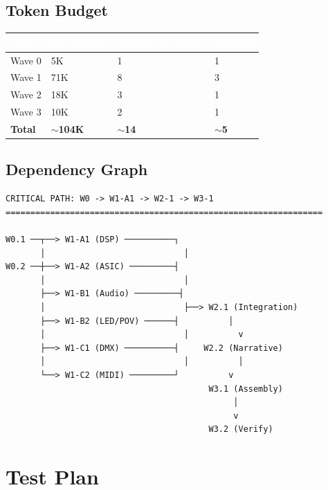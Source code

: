 \documentclass[11pt,letterpaper]{article}
\newcommand{\tableheader}[1]{\textbf{\sffamily\textcolor{white}{#1}}}
\begin{document}
\subsection{Token Budget}

\begin{center}
\begin{tabularx}{\textwidth}{L{3cm}C{2.5cm}C{3cm}C{2.5cm}}
\toprule
{}
\tableheader{Wave} & \tableheader{Est. Tokens} & \tableheader{Context Windows} & \tableheader{Sessions} \\
\midrule
Wave 0 & 5K & 1 & 1 \\
Wave 1 & 71K & 8 & 3 \\
Wave 2 & 18K & 3 & 1 \\
Wave 3 & 10K & 2 & 1 \\
\midrule
\textbf{Total} & \textbf{$\sim$104K} & \textbf{$\sim$14} & \textbf{$\sim$5} \\
\bottomrule
\end{tabularx}
\end{center}

\subsection{Dependency Graph}

\begin{asciibox}
\begin{verbatim}
CRITICAL PATH: W0 -> W1-A1 -> W2-1 -> W3-1
================================================================

W0.1 ──┬──> W1-A1 (DSP) ──────────┐
       │                            │
W0.2 ──┼──> W1-A2 (ASIC) ─────────┤
       │                            │
       ├──> W1-B1 (Audio) ─────────┤
       │                            ├──> W2.1 (Integration)
       ├──> W1-B2 (LED/POV) ──────┤          │
       │                            │          v
       ├──> W1-C1 (DMX) ──────────┤     W2.2 (Narrative)
       │                            │          │
       └──> W1-C2 (MIDI) ─────────┘          v
                                         W3.1 (Assembly)
                                              │
                                              v
                                         W3.2 (Verify)
\end{verbatim}
\end{asciibox}

\section{Test Plan}
\end{document}
